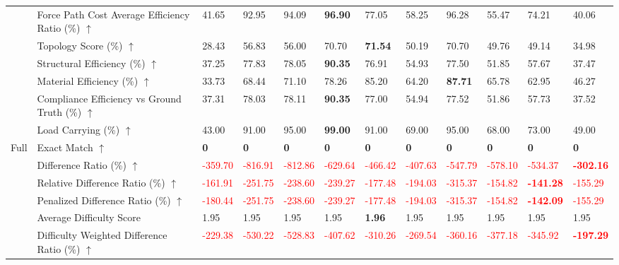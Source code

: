 \begin{table}[!h]
{\begin{tabular}{llllllllllll}
 & Force Path Cost Average Efficiency Ratio (\%) $\uparrow$ & 41.65 & 92.95 & 94.09 & \textbf{96.90} & 77.05 & 58.25 & 96.28 & 55.47 & 74.21 & 40.06 \\
 & Topology Score (\%) $\uparrow$ & 28.43 & 56.83 & 56.00 & 70.70 & \textbf{71.54} & 50.19 & 70.70 & 49.76 & 49.14 & 34.98 \\
 & Structural Efficiency (\%) $\uparrow$ & 37.25 & 77.83 & 78.05 & \textbf{90.35} & 76.91 & 54.93 & 77.50 & 51.85 & 57.67 & 37.47 \\
 & Material Efficiency (\%) $\uparrow$ & 33.73 & 68.44 & 71.10 & 78.26 & 85.20 & 64.20 & \textbf{87.71} & 65.78 & 62.95 & 46.27 \\
 & Compliance Efficiency vs Ground Truth (\%) $\uparrow$ & 37.31 & 78.03 & 78.11 & \textbf{90.35} & 77.00 & 54.94 & 77.52 & 51.86 & 57.73 & 37.52 \\
 & Load Carrying (\%) $\uparrow$ & 43.00 & 91.00 & 95.00 & \textbf{99.00} & 91.00 & 69.00 & 95.00 & 68.00 & 73.00 & 49.00 \\
Full & Exact Match $\uparrow$ & \textbf{0} & \textbf{0} & \textbf{0} & \textbf{0} & \textbf{0} & \textbf{0} & \textbf{0} & \textbf{0} & \textbf{0} & \textbf{0} \\
 & Difference Ratio (\%) $\uparrow$ & \textcolor{red}{-359.70} & \textcolor{red}{-816.91} & \textcolor{red}{-812.86} & \textcolor{red}{-629.64} & \textcolor{red}{-466.42} & \textcolor{red}{-407.63} & \textcolor{red}{-547.79} & \textcolor{red}{-578.10} & \textcolor{red}{-534.37} & \textbf{\textcolor{red}{-302.16}} \\
 & Relative Difference Ratio (\%) $\uparrow$ & \textcolor{red}{-161.91} & \textcolor{red}{-251.75} & \textcolor{red}{-238.60} & \textcolor{red}{-239.27} & \textcolor{red}{-177.48} & \textcolor{red}{-194.03} & \textcolor{red}{-315.37} & \textcolor{red}{-154.82} & \textbf{\textcolor{red}{-141.28}} & \textcolor{red}{-155.29} \\
 & Penalized Difference Ratio (\%) $\uparrow$ & \textcolor{red}{-180.44} & \textcolor{red}{-251.75} & \textcolor{red}{-238.60} & \textcolor{red}{-239.27} & \textcolor{red}{-177.48} & \textcolor{red}{-194.03} & \textcolor{red}{-315.37} & \textcolor{red}{-154.82} & \textbf{\textcolor{red}{-142.09}} & \textcolor{red}{-155.29} \\
 & Average Difficulty Score & 1.95 & 1.95 & 1.95 & 1.95 & \textbf{1.96} & 1.95 & 1.95 & 1.95 & 1.95 & 1.95 \\
 & Difficulty Weighted Difference Ratio (\%) $\uparrow$ & \textcolor{red}{-229.38} & \textcolor{red}{-530.22} & \textcolor{red}{-528.83} & \textcolor{red}{-407.62} & \textcolor{red}{-310.26} & \textcolor{red}{-269.54} & \textcolor{red}{-360.16} & \textcolor{red}{-377.18} & \textcolor{red}{-345.92} & \textbf{\textcolor{red}{-197.29}} \\

\end{tabular}}
\end{table}
